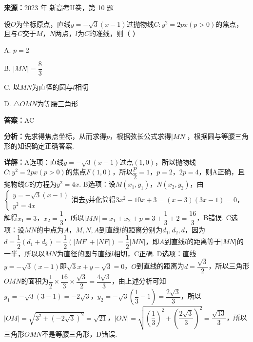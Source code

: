 \begin{question}[points=5]
\textbf{来源：}2023 年 新高考II卷，第 10 题\par
设$O$为坐标原点，直线$y=-\sqrt{3}(x-1)$过抛物线$C:y^{2}=2px(p>0)$的焦点，且与$C$交于$M$，$N$两点，$l$为$C$的准线，则（ \quad ）
\begin{choices}
  \item A. $p=2$
  \item B. $|MN|=\dfrac{8}{3}$
  \item C. 以$MN$为直径的圆与$l$相切
  \item D. $\triangle OMN$为等腰三角形
\end{choices}
\begin{solution}
\textbf{答案：}AC

\textbf{分析：}先求得焦点坐标，从而求得$p$，根据弦长公式求得$|MN|$，根据圆与等腰三角形的知识确定正确答案.

\textbf{详解：}A选项：直线$y=-\sqrt{3}(x-1)$过点$(1,0)$，所以抛物线$C:y^{2}=2px(p>0)$的焦点$F(1,0)$，所以$\dfrac{p}{2}=1$，$p=2$，$2p=4$，则A正确，且抛物线$C$的方程为$y^{2}=4x$.
B选项：设$M(x_{1},y_{1})$，$N(x_{2},y_{2})$，由$\begin{cases}y=-\sqrt{3}(x-1)\\ y^{2}=4x\end{cases}$消去$y$并化简得$3x^{2}-10x+3=(x-3)(3x-1)=0$，解得$x_{1}=3$，$x_{2}=\dfrac{1}{3}$，所以$|MN|=x_{1}+x_{2}+p=3+\dfrac{1}{3}+2=\dfrac{16}{3}$，B错误.
C选项：设$MN$的中点为$A$，$M,N,A$到直线$l$的距离分别为$d_{1},d_{2},d$，因为$d=\dfrac{1}{2}(d_{1}+d_{2})=\dfrac{1}{2}(|MF|+|NF|)=\dfrac{1}{2}|MN|$，即$A$到直线$l$的距离等于$|MN|$的一半，所以以$MN$为直径的圆与直线$l$相切，C正确.
D选项：直线$y=-\sqrt{3}(x-1)$即$\sqrt{3}x+y-\sqrt{3}=0$，$O$到直线的距离为$d=\dfrac{\sqrt{3}}{2}$，所以三角形$OMN$的面积为$\dfrac{1}{2}\times\dfrac{16}{3}\times\dfrac{\sqrt{3}}{2}=\dfrac{4\sqrt{3}}{3}$，由上述分析可知$y_{1}=-\sqrt{3}(3-1)=-2\sqrt{3}$，$y_{2}=-\sqrt{3}\left(\dfrac{1}{3}-1\right)=\dfrac{2\sqrt{3}}{3}$，所以$|OM|=\sqrt{3^{2}+(-2\sqrt{3})^{2}}=\sqrt{21}$，$|ON|=\sqrt{\left(\dfrac{1}{3}\right)^{2}+\left(\dfrac{2\sqrt{3}}{3}\right)^{2}}=\dfrac{\sqrt{13}}{3}$，所以三角形$OMN$不是等腰三角形，D错误.
\end{solution}
\end{question}

